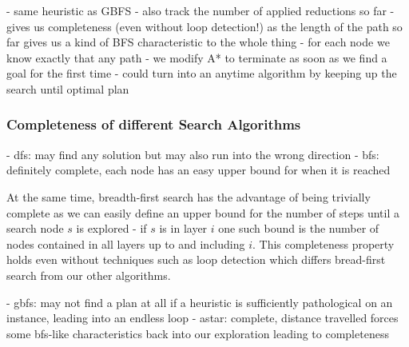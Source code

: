 - same heuristic as GBFS
- also track the number of applied reductions so far
- gives us completeness (even without loop detection!) as the length of the path so far gives us a kind of BFS characteristic to the whole thing
- for each node we know exactly that any path
- we modify A* to terminate as soon as we find a goal for the first time
- could turn into an anytime algorithm by keeping up the search until optimal plan

\subsubsection{Completeness of different Search Algorithms}
- dfs: may find any solution but may also run into the wrong direction
- bfs: definitely complete, each node has an easy upper bound for when it is reached

At the same time, breadth-first search has the advantage of being trivially complete as we can easily define an upper bound for the number of steps until a search node $s$ is explored - if $s$ is in layer $i$ one such bound is the number of nodes contained in all layers up to and including $i$. This completeness property holds even without techniques such as loop detection which differs bread-first search from our other algorithms.

- gbfs: may not find a plan at all if a heuristic is sufficiently pathological on an instance, leading into an endless loop
- astar: complete, distance travelled forces some bfs-like characteristics back into our exploration leading to completeness
